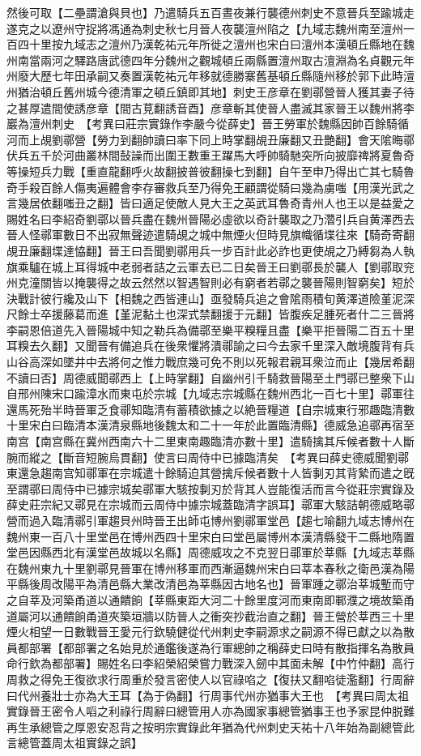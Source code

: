 然後可取【二壘謂滄與貝也】乃遣騎兵五百晝夜兼行襲德州刺史不意晉兵至踰城走遂克之以遼州守捉將馮通為刺史秋七月晉人夜襲澶州陷之【九域志魏州南至澶州一百四十里按九域志之澶州乃漢乾祐元年所徙之澶州也宋白曰澶州本漢頓丘縣地在魏州南當兩河之驛路唐武德四年分魏州之觀城頓丘兩縣置澶州取古澶淵為名貞觀元年州廢大歷七年田承嗣又奏置漢乾祐元年移就德勝寨舊基頓丘縣隨州移於郭下此時澶州猶治頓丘舊州城今德清軍之頓丘鎮即其地】刺史王彦章在劉鄩營晉人獲其妻子待之甚厚遣間使誘彦章【間古莧翻誘音酉】彦章斬其使晉人盡滅其家晉王以魏州將李巖為澶州刺史　【考異曰莊宗實錄作李嚴今從薛史】晉王勞軍於魏縣因帥百餘騎循河而上覘劉鄩營【勞力到翻帥讀曰率下同上時掌翻覘丑廉翻又丑艷翻】會天隂晦鄩伏兵五千於河曲叢林間鼔譟而出圍王數重王躍馬大呼帥騎馳突所向披靡禆將夏魯奇等操短兵力戰【重直龍翻呼火故翻披普彼翻操七到翻】自午至申乃得出亡其七騎魯奇手殺百餘人傷夷遍體會李存審救兵至乃得免王顧謂從騎曰幾為虜嗤【用漢光武之言幾居依翻嗤丑之翻】皆曰適足使敵人見大王之英武耳魯奇青州人也王以是益愛之賜姓名曰李紹奇劉鄩以晉兵盡在魏州晉陽必虛欲以奇計襲取之乃濳引兵自黄澤西去晉人怪鄩軍數日不出寂無聲迹遣騎覘之城中無煙火但時見旗幟循堞往來【騎奇寄翻覘丑廉翻堞達恊翻】晉王曰吾聞劉鄩用兵一步百計此必詐也更使覘之乃縛芻為人執旗乘驢在城上耳得城中老弱者詰之云軍去已二日矣晉王曰劉鄩長於襲人【劉鄩取兖州克潼關皆以掩襲得之故云然然以智遇智則必有窮者若鄩之襲晉陽則智窮矣】短於決戰計彼行纔及山下【相魏之西皆連山】亟發騎兵追之會隂雨積旬黄澤道險堇泥深尺餘士卒援藤葛而進【堇泥黏土也深式禁翻援于元翻】皆腹疾足腫死者什二三晉將李嗣恩倍道先入晉陽城中知之勒兵為備鄩至樂平糗糧且盡【樂平拒晉陽二百五十里耳糗去久翻】又聞晉有備追兵在後衆懼將潰鄩諭之曰今去家千里深入敵境腹背有兵山谷高深如墜井中去將何之惟力戰庶幾可免不則以死報君親耳衆泣而止【幾居希翻不讀曰否】周德威聞鄩西上【上時掌翻】自幽州引千騎救晉陽至土門鄩已整衆下山自邢州陳宋口踰漳水而東屯於宗城【九域志宗城縣在魏州西北一百七十里】鄩軍往還馬死殆半時晉軍乏食鄩知臨清有蓄積欲據之以絶晉糧道【自宗城東行邪趣臨清數十里宋白曰臨清本漢清泉縣地後魏太和二十一年於此置臨清縣】德威急追鄩再宿至南宫【南宫縣在冀州西南六十二里東南趣臨清亦數十里】遣騎擒其斥候者數十人斷腕而縱之【斷音短腕烏貫翻】使言曰周侍中已據臨清矣　【考異曰薛史德威聞劉鄩東還急趨南宫知鄩軍在宗城遣十餘騎迫其營擒斥候者數十人皆剚刃其背縶而遣之旣至謂鄩曰周侍中已據宗城矣鄩軍大駭按剚刃於背其人豈能復活而言今從莊宗實錄及薛史莊宗紀又鄩見在宗城而云周侍中據宗城蓋臨清字誤耳】鄩軍大駭詰朝德威略鄩營而過入臨清鄩引軍趨貝州時晉王出師屯博州劉鄩軍堂邑【趨七喻翻九域志博州在魏州東一百八十里堂邑在博州西四十里宋白曰堂邑屬博州本漢清縣發干二縣地隋置堂邑因縣西北有漢堂邑故城以名縣】周德威攻之不克翌日鄩軍於莘縣【九域志莘縣在魏州東九十里劉鄩見晉軍在博州移軍而西漸逼魏州宋白曰莘本春秋之衛邑漢為陽平縣後周改陽平為清邑縣大業改清邑為莘縣因古地名也】晉軍踵之鄩治莘城塹而守之自莘及河築甬道以通饋餉【莘縣東距大河二十餘里度河而東南即鄆濮之境故築甬道屬河以通饋餉甬道夾築垣牆以防晉人之衝突抄截治直之翻】晉王營於莘西三十里煙火相望一日數戰晉王愛元行欽驍健從代州刺史李嗣源求之嗣源不得已獻之以為散員都部署【都部署之名始見於通鑑後遂為行軍總帥之稱薛史曰時有散指揮名為散員命行欽為都部署】賜姓名曰李紹榮紹榮嘗力戰深入劒中其面未解【中竹仲翻】高行周救之得免王復欲求行周重於發言密使人以官祿啗之【復扶又翻啗徒濫翻】行周辭曰代州養壯士亦為大王耳【為于偽翻】行周事代州亦猶事大王也　【考異曰周太祖實錄晉王密令人㗖之利祿行周辭曰總管用人亦為國家事總管猶事王也予家昆仲脱難再生承總管之厚恩安忍背之按明宗實錄此年猶為代州刺史天祐十八年始為副總管此言總管蓋周太祖實錄之誤】